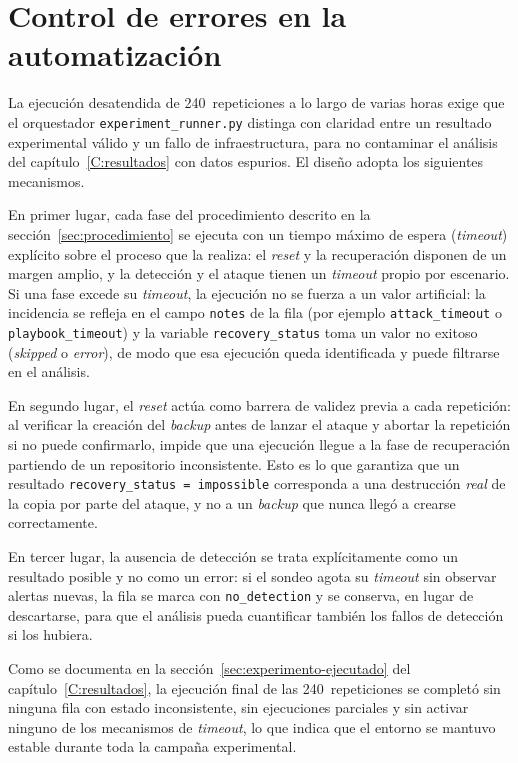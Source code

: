\documentclass[../main.tex]{subfiles}
\begin{document}
\section{Control de errores en la automatización}
\label{sec:control-errores}

La ejecución desatendida de 240~repeticiones a lo largo de varias horas exige que el
orquestador \texttt{experiment\_runner.py} distinga con claridad entre un resultado
experimental válido y un fallo de infraestructura, para no contaminar el análisis
del capítulo~\ref{C:resultados} con datos espurios. El diseño adopta los siguientes
mecanismos.

En primer lugar, cada fase del procedimiento descrito en la
sección~\ref{sec:procedimiento} se ejecuta con un tiempo máximo de espera
(\emph{timeout}) explícito sobre el proceso que la realiza: el \emph{reset} y la
recuperación disponen de un margen amplio, y la detección y el ataque tienen un
\emph{timeout} propio por escenario. Si una fase excede su \emph{timeout}, la
ejecución no se fuerza a un valor artificial: la incidencia se refleja en el campo
\texttt{notes} de la fila (por ejemplo \texttt{attack\_timeout} o
\texttt{playbook\_timeout}) y la variable \texttt{recovery\_status} toma un valor no
exitoso (\emph{skipped} o \emph{error}), de modo que esa ejecución queda
identificada y puede filtrarse en el análisis.

En segundo lugar, el \emph{reset} actúa como barrera de validez previa a cada
repetición: al verificar la creación del \emph{backup} antes de lanzar el ataque y
abortar la repetición si no puede confirmarlo, impide que una ejecución llegue a la
fase de recuperación partiendo de un repositorio inconsistente. Esto es lo que
garantiza que un resultado \texttt{recovery\_status = impossible} corresponda a una
destrucción \emph{real} de la copia por parte del ataque, y no a un \emph{backup}
que nunca llegó a crearse correctamente.

En tercer lugar, la ausencia de detección se trata explícitamente como un resultado
posible y no como un error: si el sondeo agota su \emph{timeout} sin observar
alertas nuevas, la fila se marca con \texttt{no\_detection} y se conserva, en lugar
de descartarse, para que el análisis pueda cuantificar también los fallos de
detección si los hubiera.

Como se documenta en la sección~\ref{sec:experimento-ejecutado} del
capítulo~\ref{C:resultados}, la ejecución final de las 240~repeticiones se completó
sin ninguna fila con estado inconsistente, sin ejecuciones parciales y sin activar
ninguno de los mecanismos de \emph{timeout}, lo que indica que el entorno se mantuvo
estable durante toda la campaña experimental.
\end{document}

